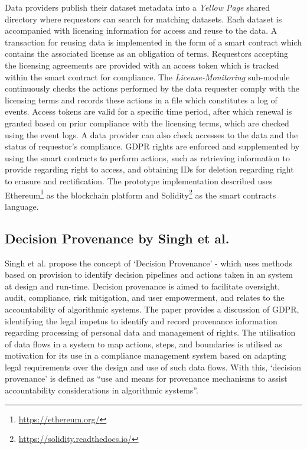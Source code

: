 Data providers publish their dataset metadata into a \textit{Yellow Page} shared directory where requestors can search for matching datasets. Each dataset is accompanied with licensing information for access and reuse to the data. A transaction for reusing data is implemented in the form of a smart contract which contains the associated license as an obligation of terms. Requestors accepting the licensing agreements are provided with an access token which is tracked within the smart contract for compliance. The \textit{License-Monitoring} sub-module continuously checks the actions performed by the data requester comply with the licensing terms and records these actions in a file which constitutes a log of events. Access tokens are valid for a specific time period, after which renewal is granted based on prior compliance with the licensing terms, which are checked using the event logs. A data provider can also check accesses to the data and the status of requestor's compliance. GDPR rights are enforced and supplemented by using the smart contracts to perform actions, such as retrieving information to provide regarding right to access, and obtaining IDs for deletion regarding right to erasure and rectification. The prototype implementation described uses Ethereum\footnote{\url{https://ethereum.org/}} as the blockchain platform and Solidity\footnote{\url{https://solidity.readthedocs.io/}} as the smart contracts language.

\subsection*{Decision Provenance by Singh et al.}
Singh et al. propose the concept of `Decision Provenance' - which uses methods based on provision to identify decision pipelines and actions taken in an system at design and run-time. 
Decision provenance is aimed to facilitate oversight, audit, compliance, risk mitigation, and user empowerment, and relates to the accountability of algorithmic systems.
The paper provides a discussion of GDPR, identifying the legal impetus to identify and record provenance information regarding processing of personal data and management of rights. 
The utilisation of data flows in a system to map actions, steps, and boundaries is utilised as motivation for its use in a compliance management system based on adapting legal requirements over the design and use of such data flows. With this, `decision provenance' is defined as ``use and means for provenance mechanisms to assist accountability considerations in algorithmic systems''.

